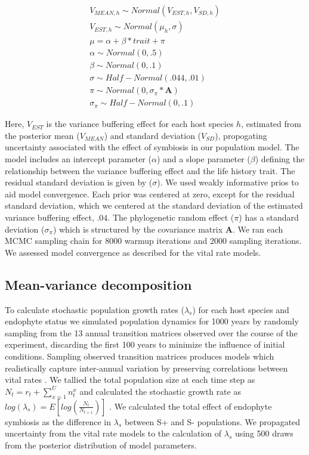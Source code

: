 \documentclass[9pt,twocolumn,twoside]{pnas-new}
\begin{document}
{\begin{subequations}
	\begin{align}
		V_{MEAN,h} \sim Normal(V_{EST,h}, V_{SD,h})\\
		V_{EST,h} \sim Normal(\mu_h,\sigma)\\
		\mu = \alpha + \beta*trait + \pi \\
		\alpha \sim Normal(0,.5)\\
		\beta \sim Normal(0,.1)\\
		\sigma \sim Half-Normal(.044,.01)\\
		\pi \sim Normal(0,\sigma_{\pi}*\mathbf{A})\\
		\sigma_{\pi} \sim Half-Normal(0,.1)
	\end{align}
\end{subequations}

Here, $V_{EST}$ is the variance buffering effect for each host species $h$, estimated from the posterior mean ($V_{MEAN}$) and standard deviation ($V_{SD}$), propogating uncertainty associated with the effect of symbiosis in our population model.
The model includes an intercept parameter ($\alpha$) and a slope parameter ($\beta$) defining the relationship between the variance buffering effect and the life history trait. 
The residual standard deviation is given by ($\sigma$). 
We used weakly informative prios to aid model convergence.
Each prior was centered at zero, except for the residual standard deviation, which we centered at the standard deviation of the estimated variance buffering effect, $.04$.
The phylogenetic random effect ($\pi$) has a standard deviation ($\sigma_{\pi}$) which is structured by the covariance matrix \textbf{A}.
We ran each MCMC sampling chain for 8000 warmup iterations and 2000 sampling iterations. 
We assessed model convergence as described for the vital rate models.

\subsection*{Mean-variance decomposition}
To calculate stochastic population growth rates ($\lambda_s$) for each host species and endophyte status we simulated population dynamics for 1000 years by randomly sampling from the 13 annual transition matrices observed over the course of the experiment, discarding the first 100 years to minimize the influence of initial conditions. 
Sampling observed transition matrices produces models which realistically capture inter-annual variation by preserving correlations between vital rates \cite{metcalf2015statistical}.
We tallied the total population size at each time step as  $N_{t} = r_{t} + \sum_{x=1}^{U}n^x_{t}$ and calculated the stochastic growth rate as $log(\lambda_s) = E[log(\frac{N_{t}}{N_{t+1}})]$ \cite{caswell2001matrix,rees2009integral}.
We calculated the total effect of endophyte symbiosis as the difference in $\lambda_s$ between S+ and S- populations. 
We propagated uncertainty from the vital rate models to the calculation of $\lambda_s$ using 500 draws from the posterior distribution of model parameters. 

}
\end{document}
